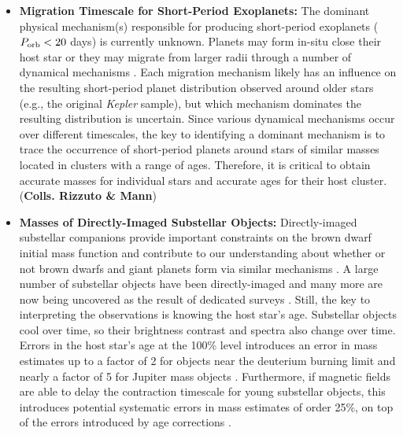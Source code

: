 \begin{itemize}
	\item {\bf Migration Timescale for Short-Period Exoplanets:} The dominant physical mechanism(s) responsible for producing short-period exoplanets ($P_{\rm orb} < 20$ days) is currently unknown. Planets may form in-situ close their host star \citep{Hansen2012, Chiang2013} or they may migrate from larger radii through a number of dynamical mechanisms \citep[e.g.,][]{Ward1997, DAngelo2002, Fabrycky2007}. Each migration mechanism likely has an influence on the resulting short-period planet distribution observed around older stars (e.g., the original \emph{Kepler} sample), but which mechanism dominates the resulting distribution is uncertain. Since various dynamical mechanisms occur over different timescales, the key to identifying a dominant mechanism is to trace the occurrence of short-period planets around stars of similar masses located in clusters with a range of ages. Therefore, it is critical to obtain accurate masses for individual stars and accurate ages for their host cluster. ({\bf Colls. Rizzuto \& Mann})\\
	
	\item {\bf Masses of Directly-Imaged Substellar Objects:} Directly-imaged substellar companions provide important constraints on the brown dwarf initial mass function \citep{Chabrier2003} and contribute to our understanding about whether or not brown dwarfs and giant planets form via similar mechanisms \citep{Luhman2012, Chabrier2014}. A large number of substellar objects have been directly-imaged \citep{Bowler2016} and many more are now being uncovered as the result of dedicated surveys \citep[e.g.,][]{Hinkley2015, Macintosh2015}. Still, the key to interpreting the observations is knowing the host star's age. Substellar objects cool over time, so their brightness contrast and spectra also change over time. Errors in the host star's age at the 100\% level introduces an error in mass estimates up to a factor of 2 for objects near the deuterium burning limit \citep{Chabrier2000} and nearly a factor of 5 for Jupiter mass objects \citep{Baraffe2003}. Furthermore, if magnetic fields are able to delay the contraction timescale for young substellar objects, this introduces potential systematic errors in mass estimates of order 25\%, on top of the errors introduced by age corrections \citep{Chabrier2000}.  \\
	

\end{itemize}
